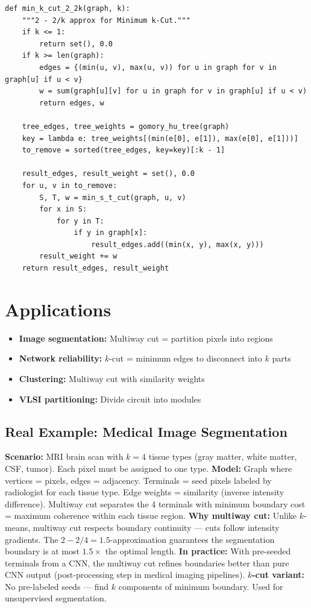 \begin{lstlisting}[style=python, caption=Multiway Cut and k-Cut]
def min_k_cut_2_2k(graph, k):
    """2 - 2/k approx for Minimum k-Cut."""
    if k <= 1:
        return set(), 0.0
    if k >= len(graph):
        edges = {(min(u, v), max(u, v)) for u in graph for v in graph[u] if u < v}
        w = sum(graph[u][v] for u in graph for v in graph[u] if u < v)
        return edges, w

    tree_edges, tree_weights = gomory_hu_tree(graph)
    key = lambda e: tree_weights[(min(e[0], e[1]), max(e[0], e[1]))]
    to_remove = sorted(tree_edges, key=key)[:k - 1]

    result_edges, result_weight = set(), 0.0
    for u, v in to_remove:
        S, T, w = min_s_t_cut(graph, u, v)
        for x in S:
            for y in T:
                if y in graph[x]:
                    result_edges.add((min(x, y), max(x, y)))
        result_weight += w
    return result_edges, result_weight
\end{lstlisting}

\section{Applications}
\begin{itemize}
    \item \textbf{Image segmentation:} Multiway cut = partition pixels into regions
    \item \textbf{Network reliability:} $k$-cut = minimum edges to disconnect into $k$ parts
    \item \textbf{Clustering:} Multiway cut with similarity weights
    \item \textbf{VLSI partitioning:} Divide circuit into modules
\end{itemize}

\subsection*{Real Example: Medical Image Segmentation}
\textbf{Scenario:} MRI brain scan with $k=4$ tissue types (gray matter, white matter, CSF, tumor). Each pixel must be assigned to one type.
\textbf{Model:} Graph where vertices = pixels, edges = adjacency. Terminals = seed pixels labeled by radiologist for each tissue type. Edge weights = similarity (inverse intensity difference). Multiway cut separates the 4 terminals with minimum boundary cost = maximum coherence within each tissue region.
\textbf{Why multiway cut:} Unlike $k$-means, multiway cut respects boundary continuity — cuts follow intensity gradients. The $2-2/4 = 1.5$-approximation guarantees the segmentation boundary is at most $1.5\times$ the optimal length.
\textbf{In practice:} With pre-seeded terminals from a CNN, the multiway cut refines boundaries better than pure CNN output (post-processing step in medical imaging pipelines).
\textbf{$k$-cut variant:} No pre-labeled seeds — find $k$ components of minimum boundary. Used for unsupervised segmentation.

